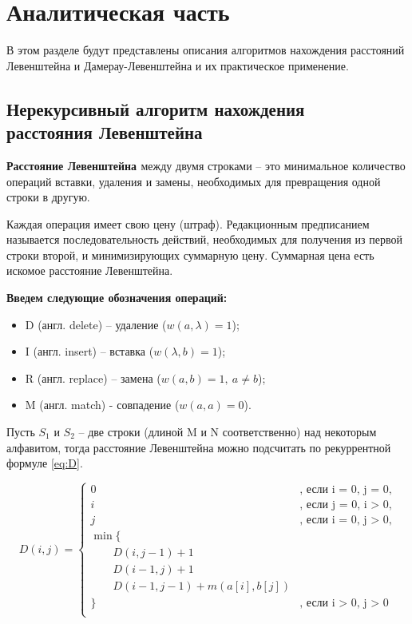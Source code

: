 \chapter{Аналитическая часть}
В этом разделе будут представлены описания алгоритмов нахождения расстояний Левенштейна и Дамерау-Левенштейна и их практическое применение.

\section{Нерекурсивный алгоритм нахождения \\расстояния Левенштейна}

\textbf{Расстояние Левенштейна \cite{Levenshtein}} между двумя строками -- это минимальное количество операций вставки, удаления и замены, необходимых для превращения одной строки в другую.

Каждая операция имеет свою цену (штраф). Редакционным предписанием называется последовательность действий, необходимых для получения из первой строки второй, и минимизирующих суммарную цену. Суммарная цена есть искомое расстояние Левенштейна.

\bigskip

\textbf{Введем следующие обозначения операций:} 
\begin{itemize}
	\item D (англ. delete) -- удаление ($w(a,\lambda)=1$);
	\item I (англ. insert) -- вставка ($w(\lambda,b)=1$);
	\item R (англ. replace) -- замена  ($w(a,b)=1, \medspace a \neq b$);
	\item M (англ. match) - совпадение ($w(a,a)=0$).
\end{itemize}

Пусть $S_{1}$ и $S_{2}$ -- две строки (длиной M и N соответственно) над некоторым алфавитом, тогда расстояние Левенштейна можно подсчитать по рекуррентной формуле \ref{eq:D}.

\begin{equation}
	\label{eq:D}
	D(i, j) = \begin{cases}
		
		0 &\text{, если i = 0, j = 0,}\\
		i &\text{, если j = 0, i > 0,}\\
		j &\text{, если i = 0, j > 0,}\\
		\min \lbrace \\
		\qquad D(i, j-1) + 1\\
		\qquad D(i-1, j) + 1\\
		\qquad D(i-1, j-1) + m(a[i], b[j]) \\
		\rbrace &\text{, если i > 0, j > 0}\\
	\end{cases}
\end{equation}

